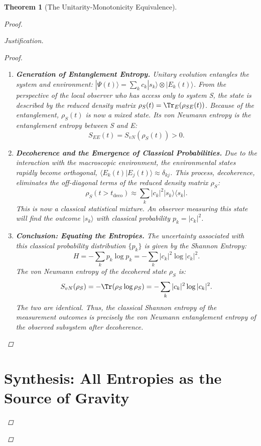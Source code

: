 \documentclass[11pt, letterpaper]{report}
\theoremstyle{plain} %
\newtheorem{theorem}{Theorem}[chapter]
\theoremstyle{definition} %
\theoremstyle{remark} %
\begin{document}
\begin{theorem}[The Unitarity-Monotonicity Equivalence]
\begin{proof}
\begin{proof}[Justification]
\begin{proof}
\begin{enumerate}
    \item \textbf{Generation of Entanglement Entropy.} Unitary evolution entangles the system and environment: $|\Psi(t)\rangle = \sum_k c_k |s_k\rangle \otimes |E_k(t)\rangle$. From the perspective of the local observer who has access only to system S, the state is described by the reduced density matrix $\rho_S(t) = \Tr_E(\rho_{SE}(t))$. Because of the entanglement, $\rho_S(t)$ is now a mixed state. Its von Neumann entropy is the entanglement entropy between S and E:
    \begin{equation}
        S_{EE}(t) = S_{vN}(\rho_S(t)) > 0.
    \end{equation}

    \item \textbf{Decoherence and the Emergence of Classical Probabilities.} Due to the interaction with the macroscopic environment, the environmental states rapidly become orthogonal, $\langle E_k(t)|E_j(t)\rangle \approx \delta_{kj}$. This process, decoherence, eliminates the off-diagonal terms of the reduced density matrix $\rho_S$:
    \begin{equation}
        \rho_S(t > t_{\text{deco}}) \approx \sum_k |c_k|^2 |s_k\rangle\langle s_k|.
    \end{equation}
    This is now a classical statistical mixture. An observer measuring this state will find the outcome $|s_k\rangle$ with classical probability $p_k = |c_k|^2$.

    \item \textbf{Conclusion: Equating the Entropies.} The uncertainty associated with this classical probability distribution $\{p_k\}$ is given by the Shannon Entropy:
    \begin{equation}
        H = -\sum_k p_k \log p_k = -\sum_k |c_k|^2 \log |c_k|^2.
    \end{equation}
    The von Neumann entropy of the decohered state $\rho_S$ is:
    \begin{equation}
        S_{vN}(\rho_S) = -\Tr(\rho_S \log\rho_S) = -\sum_k |c_k|^2 \log |c_k|^2.
    \end{equation}
    The two are identical. Thus, the classical Shannon entropy of the measurement outcomes is precisely the von Neumann entanglement entropy of the observed subsystem after decoherence.
\end{enumerate}
\end{proof}

\section{Synthesis: All Entropies as the Source of Gravity}
\label{app:all_entropy_gravity}


\end{proof}
\end{proof}
\end{theorem}
\end{document}
